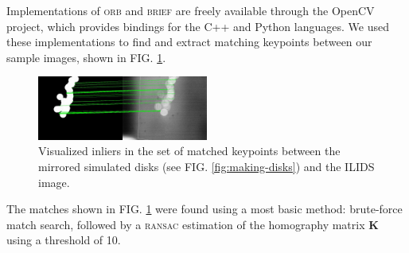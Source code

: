 \documentclass[floatfix,aip,rsi,reprint,graphicx]{revtex4-1}
\begin{document}
Implementations of \textsc{orb} and \textsc{brief} are freely available through
the OpenCV project, which provides bindings for the C++ and Python languages. We
used these implementations to find and extract matching keypoints between our
sample images, shown in FIG. \ref{fig:matching}.

\begin{figure}
    \centering
    \includegraphics[width=0.5\textwidth]{orb_images/asift-matching.jpg}
    \caption{Visualized inliers in the set of matched keypoints between the
    mirrored simulated disks (see FIG. \ref{fig:making-disks}) and the ILIDS image. \label{fig:matching}}
\end{figure}

The matches shown in FIG. \ref{fig:matching} were found using a most basic
method: brute-force match search, followed by a \textsc{ransac} estimation of the
homography matrix $\mathbf{K}$ using a threshold of 10.
\end{document}
